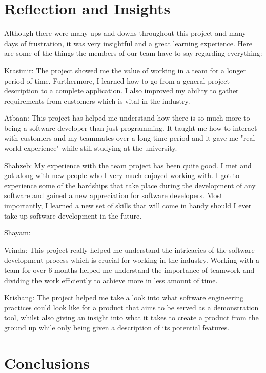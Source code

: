 \documentclass{l3proj}
\begin{document}
\section{Reflection and Insights}

Although there were many ups and downs throughout this project and many days of frustration, it was very insightful and a great learning experience. Here are some of the things the members of our team have to say regarding everything:

Krasimir: The project showed me the value of working in a team for a longer period of time. Furthermore, I learned how to go from a general project description to a complete application. I also improved my ability to gather requirements from customers which is vital in the industry.

Atbaan: This project has helped me understand how there is so much more to being a software developer than just programming. It taught me how to interact with customers and my teammates over a long time period and it gave me "real-world experience" while still studying at the university.

Shahzeb: My experience with the team project has been quite good. I met and got along with new people who I very much enjoyed working with. I got to experience some of the hardships that take place during the development of any software and gained a new appreciation for software developers. Most importantly, I learned a new set of skills that will come in handy should I ever take up software development in the future.

Shayam:

Vrinda: This project really helped me understand the intricacies of the software development process which is crucial for working in the industry. Working with a team for over 6 months helped me understand the importance of teamwork and dividing the work efficiently to achieve more in less amount of time.

Krishang: The project helped me take a look into what software engineering practices could look like for a product that aims to be served as a demonstration tool, whilst also giving an insight into what it takes to create a product from the ground up while only being given a description of its potential features.



\section{Conclusions}





\end{document}
